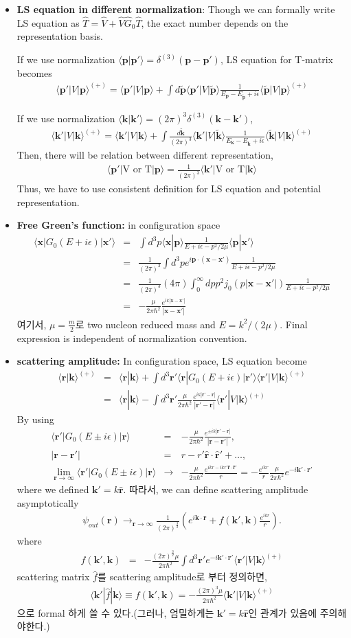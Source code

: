 \documentclass[10pt]{article}
\def\bm{\boldsymbol}
\newcommand{\bea}{\begin{eqnarray}}
\newcommand{\eea}{\end{eqnarray}}
\newcommand{\no}{\nonumber \\}
\def\vp{{\bm p}}
\def\vk{{\bm k}}
\def\vx{{\bm x}}
\def\vr{{\bm r}}
\def\la{\langle}
\def\ra{\rangle}
\begin{document}
\begin{itemize}
\item {\bf LS equation in different normalization}: Though we can formally write LS equation as
$ \hat{T}={\hat V}+\hat{V} \hat{G}_0 \hat{T} $, the exact number depends on the representation
basis.

If we use normalization $\la \vp|\vp'\ra=\delta^{(3)}(\vp-\vp') $, LS equation for T-matrix becomes
\bea 
\la\vp'|V|\vp\ra^{(+)}
=\la \vp'|V|\vp\ra
+\int d\tilde{\vp}
\la \vp'|V|\tilde{\vp}\ra
\frac{1}{E_\vp-E_{\tilde{\vp}}+i\epsilon}
\la\tilde{\vp}|V|\vp\ra^{(+)}
\eea  

If we use normalization $\la \vk|\vk'\ra=(2\pi)^3\delta^{(3)}(\vk-\vk') $,
\bea 
\la\vk'|V|\vk\ra^{(+)}
=\la \vk'|V|\vk\ra
+\int \frac{d\tilde{\vk}}{(2\pi)^3}
\la \vk'|V|\tilde{\vk}\ra
\frac{1}{E_\vk-E_{\tilde{\vk}}+i\epsilon}
\la\tilde{\vk}|V|\vk\ra^{(+)}
\eea 
Then, there will be relation between different representation,
\bea 
\la \vp'|\mbox{V or T}|\vp\ra =\frac{1}{(2\pi)^3} \la \vk'|\mbox{V or T}|\vk\ra
\eea 
Thus, we have to use consistent definition for LS equation and potential representation.


\item {\bf Free Green's function:} in configuration space
\bea
\la \vx|G_0(E+i\epsilon)|\vx'\ra
&=&\int d^3 p \la \vx|\vp\ra\frac{1}{E+i\epsilon-p^2/2\mu}\la \vp|\vx'\ra\no 
&=&\frac{1}{(2\pi)^3}\int d^3 p e^{i\vp\cdot(\vx-\vx')}
\frac{1}{E+i\epsilon-p^2/{2\mu}}\no
&=&\frac{1}{(2\pi)^3}(4\pi)\int_0^\infty d p p^2 j_0(p|\vx-\vx'|)
     \frac{1}{E+i\epsilon-p^2/2\mu}\no
&=&-\frac{\mu}{2\pi\hbar^2}
     \frac{e^{i k|\vx-\vx'|}}{|\vx-\vx'|}
\eea
여기서, $\mu=\frac{m}{2}$로 two nucleon reduced mass
and $E=k^2/(2\mu)$. Final expression is independent of normalization
convention.


\item {\bf scattering amplitude:} In configuration space, LS equation become
\bea
\la\vr|\vk\ra^{(+)}
&=&\la \vr|\vk\ra+\int d^3\vr' \la \vr|G_0(E+i\epsilon)|\vr' \ra
 \la\vr'|V|\vk\ra^{(+)} \no 
&=&\la \vr|\vk\ra- \int d^3\vr'\frac{\mu}{2\pi\hbar^2}
   \frac{e^{ik|\vr'-\vr|}}{|\vr'-\vr|}\la \vr'|V|\vk\ra^{(+)}
\eea
By using
\bea
\la \vr'|G_0(E\pm i\epsilon)|\vr \ra&=&-\frac{\mu}{2\pi\hbar^2}
              \frac{e^{\pm i k|\vr'-\vr|}}{|\vr-\vr'|},\no 
|\vr-\vr'|&=& r-r' {\hat \vr}\cdot{\hat \vr'}+\dots,\no 
\lim_{\vr\to \infty}\la \vr'|G_0(E\pm i\epsilon)|\vr \ra
   &\to& -\frac{\mu}{2\pi\hbar^2}
   \frac{e^{ikr-ikr'\hat{\vr}\cdot{\hat\vr}'}}{r}
   = -\frac{e^{ikr}}{r}\frac{\mu}{2\pi\hbar^2}e^{-i\vk' \cdot{\vr}'}
\eea
where we defined $\vk'=k\hat{\vr}$.
따라서, 
we can define scattering amplitude asymptotically
\bea
\psi_{out}(\vr)\to_{\vr\to \infty} \frac{1}{(2\pi)^{\frac{3}{2}}}
     \left(e^{i\vk\cdot\vr}+f(\vk',\vk)\frac{e^{ikr}}{r}\right).
\eea
where
\bea
f(\vk',\vk)&=&-\frac{(2\pi)^{\frac{3}{2}}\mu}{2\pi\hbar^2} 
                    \int d^3\vr' e^{-i\vk'\cdot\vr'}
                    \la \vr'|V|\vk\ra^{(+)}
\eea
scattering matrix $\hat{f}$를 scattering amplitude로 부터 정의하면,
\bea
\boxed{
\la \vk'|\hat{f}|\vk\ra\equiv f(\vk',\vk)
=-\frac{(2\pi)^3\mu}{2\pi\hbar^2}\la \vk'|V|\vk\ra^{(+)}
}
\eea
으로 formal 하게 쓸 수 있다.(그러나, 엄밀하게는 $\vk'=k\hat{\vr}$인
관계가 있음에 주의해야한다.)


\end{itemize}
\end{document}
